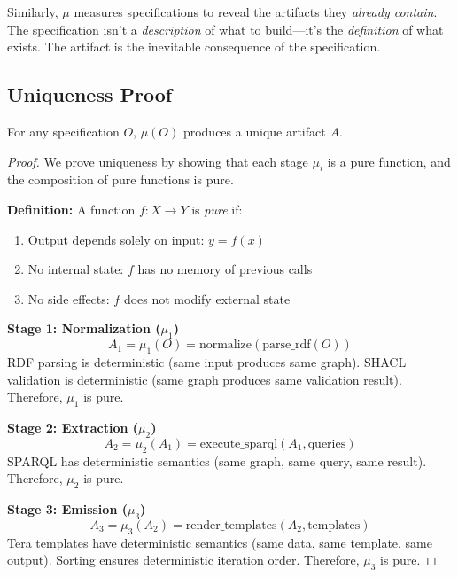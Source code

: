 Similarly, \(\mu\) measures specifications to reveal the artifacts they \textit{already contain}. The specification isn't a \textit{description} of what to build---it's the \textit{definition} of what exists. The artifact is the inevitable consequence of the specification.

\subsection{Uniqueness Proof}

\begin{theorem}
    For any specification \(O\), \(\mu(O)\) produces a unique artifact \(A\).
\end{theorem}

\begin{proof}
    We prove uniqueness by showing that each stage \(\mu_i\) is a pure function, and the composition of pure functions is pure.

    \textbf{Definition:} A function \(f: X \rightarrow Y\) is \textit{pure} if:
    \begin{enumerate}
        \item Output depends solely on input: \(y = f(x)\)
        \item No internal state: \(f\) has no memory of previous calls
        \item No side effects: \(f\) does not modify external state
    \end{enumerate}

    \textbf{Stage 1: Normalization (\(\mu_1\))}
    \begin{equation}
        A_1 = \mu_1(O) = \text{normalize}(\text{parse\_rdf}(O))
    \end{equation}
    RDF parsing is deterministic (same input produces same graph). SHACL validation is deterministic (same graph produces same validation result). Therefore, \(\mu_1\) is pure.

    \textbf{Stage 2: Extraction (\(\mu_2\))}
    \begin{equation}
        A_2 = \mu_2(A_1) = \text{execute\_sparql}(A_1, \text{queries})
    \end{equation}
    SPARQL has deterministic semantics (same graph, same query, same result). Therefore, \(\mu_2\) is pure.

    \textbf{Stage 3: Emission (\(\mu_3\))}
    \begin{equation}
        A_3 = \mu_3(A_2) = \text{render\_templates}(A_2, \text{templates})
    \end{equation}
    Tera templates have deterministic semantics (same data, same template, same output). Sorting ensures deterministic iteration order. Therefore, \(\mu_3\) is pure.


\end{proof}
